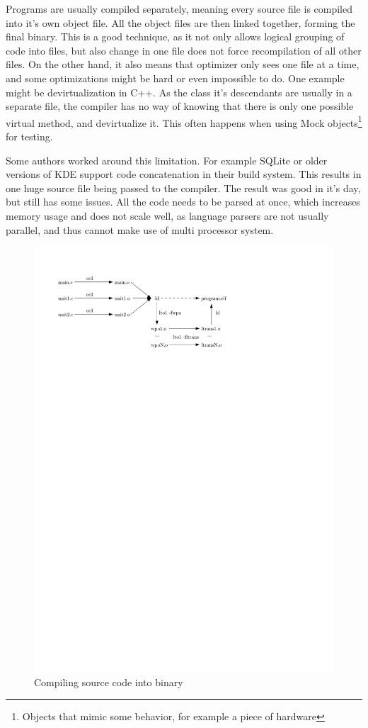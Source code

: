 Programs are usually compiled separately, meaning every source file is compiled
into it's own object file. All the object files are then linked together,
forming the final binary. This is a good technique, as it not only allows
logical grouping of code into files, but also change in one file does not force
recompilation of all other files. On the other hand, it also means that
optimizer only sees one file at a time, and some optimizations might be hard or
even impossible to do.  One example might be devirtualization in C++. As the
class it's descendants are usually in a separate file, the compiler has no way
of knowing that there is only one possible virtual method, and devirtualize it.
This often happens when using Mock objects\footnote{Objects that mimic some
behavior, for example a piece of hardware} for testing.

Some authors worked around this limitation. For example SQLite or older versions
of KDE support code concatenation in their build system. This results in one
huge source file being passed to the compiler. The result was good in it's day,
but still has some issues. All the code needs to be parsed at once, which
increases memory usage and does not scale well, as language parsers are not
usually parallel, and thus cannot make use of multi processor system.

\begin{figure}[h!]
	\label{figure-lto-workflow}
	\centering
	\includegraphics{./img/lto-workflow.pdf}
	\caption{Compiling source code into binary}
\end{figure}

